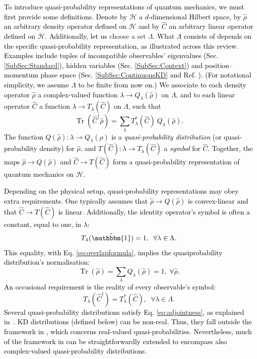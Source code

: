 \documentclass[%
 reprint,
superscriptaddress,
nofootinbib,
bibnotes,
 amsmath,amssymb,
 aps,
]{revtex4-1}
\theoremstyle{plain}
\DeclareMathOperator{\Tr}{Tr}
\newcommand{\Dave}[1]{\textcolor{black}{#1} }
\newcommand{\nicole}[1]{\textcolor{black}{#1} }
\begin{document}
\Dave{To introduce quasi-probability representations of quantum mechanics, we must first provide some definitions.}
  \nicole{Denote by $\mathcal H$ a $d$-dimensional Hilbert space, by $\hat{\rho}$ an arbitrary density operator defined on $\mathcal H$ and by $\hat C$ an arbitrary linear operator defined on $\mathcal H$.   Additionally, let us} choose a set $\Lambda$. 
  \nicole{What $\Lambda$ consists of depends on the specific quasi-probability representation, as illustrated across this review. Examples include tuples of incompatible observables' eigenvalues (Sec. \ref{SubSec:Standard}),  hidden variables (Sec. \ref{SubSec:Context}) and position--momentum phase space (Sec. \ref{SubSec:ContinuousKD} and Ref. \cite{Wigner32}). 
  (For \Dave{notational} simplicity, we assume $\Lambda$ to be finite from now on.)
  We associate to each density operator $\hat{\rho}$ a complex-valued function 
  $\lambda \to Q_\lambda({\hat\rho})$ on $\Lambda$,
  and to each linear operator $\hat C$ a function $\lambda \to T_\lambda({\hat C})$ on $\Lambda$, such that
\begin{equation}\label{eq:overlapformula}
\Tr (\hat C^\dagger \hat\rho)
=\sum_{\lambda} T_\lambda^*({\hat C}) \: Q_\lambda({\hat\rho}).
\end{equation}
The function $Q(\hat\rho): \lambda \to Q_\lambda({\hat\rho})$ is a \emph{quasi-probability distribution} (or quasi-probability density) for $\hat{\rho}$, and \Dave{$T(\hat C):\lambda\to T_\lambda({\hat C })$} a \emph{symbol} for $\hat C$. Together, the maps $\hat \rho\to Q({\hat\rho})$ and $\hat C\to T({\hat C})$ form a quasi-probability representation of quantum mechanics on $\mathcal H$. 
}


\nicole{Depending on the physical setup, quasi-probability representations may obey extra requirements.
One typically assumes that $\hat{\rho} \to Q({\hat\rho})$ is convex-linear and that $\hat C \to T({\hat C})$ is linear. Additionally, the identity operator's symbol is often a constant, equal to one, in $\lambda$:
\begin{equation}\label{eq:normalize1}
\Dave{ T_{\lambda}({\hat{\mathbbm{1}}})=1, \; \; \forall \lambda \in \Lambda . }
\end{equation}
This equality, with Eq. \eqref{eq:overlapformula}, implies 
\nicole{the quasiprobability distribution's normalisation:}
\begin{equation}\label{eq:normalize2}
\Tr \left( \hat{\rho} \right) = \sum_{\lambda} Q_\lambda({\hat{\rho}}) =1, \; \forall \hat{\rho} .
\end{equation}
An occasional requirement is the reality of every observable's symbol:
\begin{equation}\label{eq:adjointness}
T_{\lambda} ({\hat C^\dagger})=T^*_{\lambda}({\hat C}), \; \; \forall \lambda \in \Lambda .
\end{equation}
Several quasi-probability distributions \Dave{satisfy Eq. \eqref{eq:adjointness},}
as explained in~\cite{Ferrie2011}. KD distributions (defined below) can be non-real. Thus, they fall outside the framework in \cite{Ferrie2011}, which concerns real-valued quasi-probabilities.  \Dave{Nevertheless, much of the framework in \cite{Ferrie2011} can be straightforwardly extended to encompass also complex-valued quasi-probability distributions.} 
}
\end{document}
